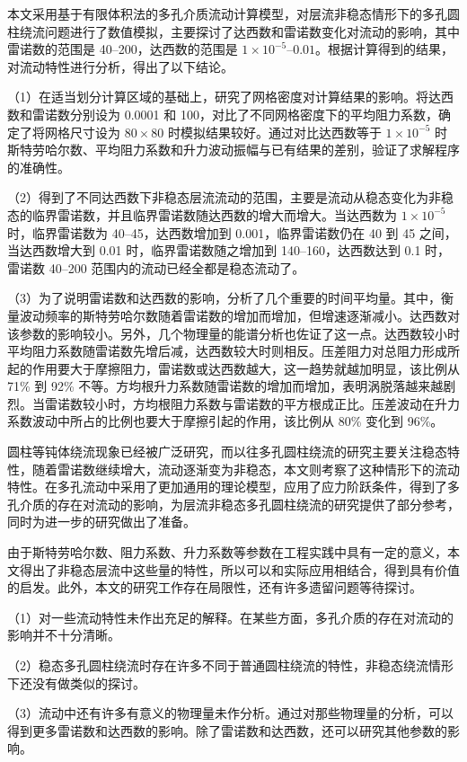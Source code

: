 \begin{conclusions}

本文采用基于有限体积法的多孔介质流动计算模型，对层流非稳态情形下的多孔圆柱绕流问题进行了数值模拟，主要探讨了达西数和雷诺数变化对流动的影响，其中雷诺数的范围是 40--200，达西数的范围是 $1\times 10^{-5}$--$0.01$。根据计算得到的结果，对流动特性进行分析，得出了以下结论。

（1）在适当划分计算区域的基础上，研究了网格密度对计算结果的影响。将达西数和雷诺数分别设为 0.0001 和 100，对比了不同网格密度下的平均阻力系数，确定了将网格尺寸设为 $80\times 80$ 时模拟结果较好。通过对比达西数等于 $1\times 10^{-5}$ 时斯特劳哈尔数、平均阻力系数和升力波动振幅与已有结果的差别，验证了求解程序的准确性。

（2）得到了不同达西数下非稳态层流流动的范围，主要是流动从稳态变化为非稳态的临界雷诺数，并且临界雷诺数随达西数的增大而增大。当达西数为 $1\times 10^{-5}$ 时，临界雷诺数为 40--45，达西数增加到 0.001，临界雷诺数仍在 40 到 45 之间，当达西数增大到 0.01 时，临界雷诺数随之增加到 140--160，达西数达到 0.1 时，雷诺数 40--200 范围内的流动已经全都是稳态流动了。

（3）为了说明雷诺数和达西数的影响，分析了几个重要的时间平均量。其中，衡量波动频率的斯特劳哈尔数随着雷诺数的增加而增加，但增速逐渐减小。达西数对该参数的影响较小。另外，几个物理量的能谱分析也佐证了这一点。达西数较小时平均阻力系数随雷诺数先增后减，达西数较大时则相反。压差阻力对总阻力形成所起的作用要大于摩擦阻力，雷诺数或达西数越大，这一趋势就越加明显，该比例从 71\% 到 92\% 不等。方均根升力系数随雷诺数的增加而增加，表明涡脱落越来越剧烈。当雷诺数较小时，方均根阻力系数与雷诺数的平方根成正比。压差波动在升力系数波动中所占的比例也要大于摩擦引起的作用，该比例从 80\% 变化到 96\%。%

圆柱等钝体绕流现象已经被广泛研究，而以往多孔圆柱绕流的研究主要关注稳态特性，随着雷诺数继续增大，流动逐渐变为非稳态，本文则考察了这种情形下的流动特性。在多孔流动中采用了更加通用的理论模型，应用了应力阶跃条件，得到了多孔介质的存在对流动的影响，为层流非稳态多孔圆柱绕流的研究提供了部分参考，同时为进一步的研究做出了准备。

由于斯特劳哈尔数、阻力系数、升力系数等参数在工程实践中具有一定的意义，本文得出了非稳态层流中这些量的特性，所以可以和实际应用相结合，得到具有价值的启发。此外，本文的研究工作存在局限性，还有许多遗留问题等待探讨。

（1）对一些流动特性未作出充足的解释。在某些方面，多孔介质的存在对流动的影响并不十分清晰。

（2）稳态多孔圆柱绕流时存在许多不同于普通圆柱绕流的特性，非稳态绕流情形下还没有做类似的探讨。

（3）流动中还有许多有意义的物理量未作分析。通过对那些物理量的分析，可以得到更多雷诺数和达西数的影响。除了雷诺数和达西数，还可以研究其他参数的影响。

\end{conclusions}
